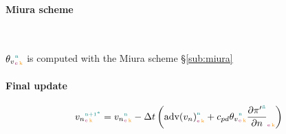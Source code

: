 \paragraph{Miura scheme}\

$\vpotemp{\n}{\e}{\k}$ is computed with the Miura scheme \S\ref{sub:miura}

\paragraph{Final update}

\begin{equation}
  \vn{\n+1^*}{\e}{\k} = \vn{\n}{\e}{\k} - \Dt \left( \advvn{\n}{\e}{\k} + \cpd \vpotemp{\n}{\e}{\k} \exnerprimegradh{\ntilde}{\e}{\k} \right)
\end{equation}
